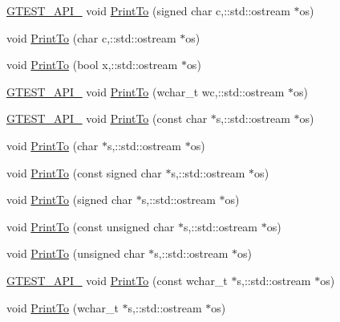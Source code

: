 \begin{DoxyCompactItemize}
\item 
\hyperlink{gtest-port_8h_aa73be6f0ba4a7456180a94904ce17790}{G\+T\+E\+S\+T\+\_\+\+A\+P\+I\+\_\+} void \hyperlink{namespacetesting_1_1internal_a09f551128c4d165c37004e36ccc87aa0}{Print\+To} (signed char c,\+::std\+::ostream $\ast$os)
\item 
void \hyperlink{namespacetesting_1_1internal_ae91b06a9e343f5ddabff85626a7d507a}{Print\+To} (char c,\+::std\+::ostream $\ast$os)
\item 
void \hyperlink{namespacetesting_1_1internal_a832beb8c56070fc5c175b8bfd8bbeba0}{Print\+To} (bool x,\+::std\+::ostream $\ast$os)
\item 
\hyperlink{gtest-port_8h_aa73be6f0ba4a7456180a94904ce17790}{G\+T\+E\+S\+T\+\_\+\+A\+P\+I\+\_\+} void \hyperlink{namespacetesting_1_1internal_a3802453cf4e3f4870f589c69c7b43b2b}{Print\+To} (wchar\+\_\+t wc,\+::std\+::ostream $\ast$os)
\item 
\hyperlink{gtest-port_8h_aa73be6f0ba4a7456180a94904ce17790}{G\+T\+E\+S\+T\+\_\+\+A\+P\+I\+\_\+} void \hyperlink{namespacetesting_1_1internal_afc6dad64c4dd4799036f252c07d8a59f}{Print\+To} (const char $\ast$s,\+::std\+::ostream $\ast$os)
\item 
void \hyperlink{namespacetesting_1_1internal_ae04a499cedbda0b244c216211081a8b6}{Print\+To} (char $\ast$s,\+::std\+::ostream $\ast$os)
\item 
void \hyperlink{namespacetesting_1_1internal_af4616278b2c3ac265ad80481e0ce8da7}{Print\+To} (const signed char $\ast$s,\+::std\+::ostream $\ast$os)
\item 
void \hyperlink{namespacetesting_1_1internal_abac47db29a65b1633028fe8001f57212}{Print\+To} (signed char $\ast$s,\+::std\+::ostream $\ast$os)
\item 
void \hyperlink{namespacetesting_1_1internal_a96409c0b7d8ce520c40a0aa5eb9280b6}{Print\+To} (const unsigned char $\ast$s,\+::std\+::ostream $\ast$os)
\item 
void \hyperlink{namespacetesting_1_1internal_a10f8d85ee591c315557372669c02fbb7}{Print\+To} (unsigned char $\ast$s,\+::std\+::ostream $\ast$os)
\item 
\hyperlink{gtest-port_8h_aa73be6f0ba4a7456180a94904ce17790}{G\+T\+E\+S\+T\+\_\+\+A\+P\+I\+\_\+} void \hyperlink{namespacetesting_1_1internal_a9f0cce661c0cff119402169bb08131fa}{Print\+To} (const wchar\+\_\+t $\ast$s,\+::std\+::ostream $\ast$os)
\item 
void \hyperlink{namespacetesting_1_1internal_a43ae763e7cd5602ebbd9bdc5884203f0}{Print\+To} (wchar\+\_\+t $\ast$s,\+::std\+::ostream $\ast$os)

\end{DoxyCompactItemize}
